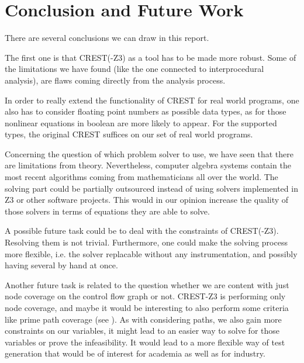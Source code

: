 \documentclass[oribibl]{llncs}
\begin{document}
\section{Conclusion and Future Work}
\label{sctn:Conclusion}

There are several conclusions we can draw in this report.

The first one is that \textsc{CREST(-Z3)} as a tool has to be made more robust. Some of the limitations we have found (like the one connected to interprocedural analysis), are flaws coming directly from the analysis process.

In order to really extend the functionality of \textsc{CREST} for real world programs, one also has to consider floating point numbers as possible data types, as for those nonlinear equations in boolean are more likely to appear. For the supported types, the original \textsc{CREST} suffices on our set of real world programs.

Concerning the question of which problem solver to use, we have seen that there are limitations from theory. Nevertheless, computer algebra systems contain the most recent algorithms coming from mathematicians all over the world. The solving part could be partially outsourced instead of using solvers implemented in \textsc{Z3} or other software projects. This would in our opinion increase the quality of those solvers in terms of equations they are able to solve.

A possible future task could be to deal with the constraints of \textsc{CREST(-Z3)}. Resolving them is not trivial. Furthermore, one could make the solving process more flexible, i.e. the solver replacable without any instrumentation, and possibly having several by hand at once.

Another future task is related to the question whether we are content with just node coverage on the control flow graph or not. \textsc{CREST-Z3} is performing only node coverage, and maybe it would be interesting to also perform some criteria like prime path coverage (see \cite{ammann2008introduction}). As with considering paths, we also gain more constraints on our variables, it might lead to an easier way to solve for those variables or prove the infeasibility. It would lead to a more flexible way of test generation that would be of interest for academia as well as for industry.





\end{document}
